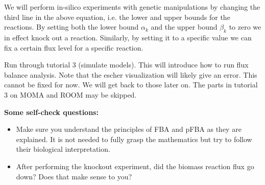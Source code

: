 \documentclass{article}
\begin{document}
We will perform in-silico experiments with genetic manipulations by changing the third line in the above equation, i.e. the lower and upper bounds for the reactions. By setting both the lower bound $\alpha_k$ and the upper bound $\beta_k$ to zero we in effect knock out a reaction. Similarly, by setting it to a specific value we can fix a certain flux level for a specific reaction.

\begin{tcolorbox}[width=\textwidth,colback={yellow},title={ASSIGNMENT},coltitle=white]

Run through tutorial 3 (simulate models). This will introduce how to run flux balance analysis. Note that the escher visualization will likely give an error. This cannot be fixed for now. We will get back to those later on. The parts in tutorial 3 on MOMA and ROOM may be skipped.

\textbf{Some self-check questions:}
\begin{itemize}
\item Make sure you understand the principles of FBA and pFBA as they are explained. It is not needed to fully grasp the mathematics but try to follow their biological interpretation.
\item After performing the knockout experiment, did the biomass reaction flux go down? Does that make sense to you?
\end{itemize}
\end{tcolorbox}
\end{document}
